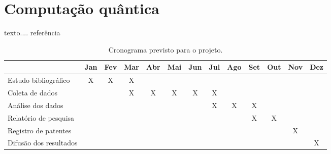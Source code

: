\chapter{Computação quântica}

texto.... referência~\cite{chomsky57}

\begin{table}
  \begin{tabular}{l|cccccc|cccccc}
    \hline
    & Jan & Fev & Mar & Abr & Mai & Jun & Jul & Ago & Set & Out & Nov & Dez \\
    \hline
    Estudo bibliográfico   & X & X & X &   &   &   &   &   &   &   &   &   \\
    Coleta de dados        &   &   & X & X & X & X & X &   &   &   &   &   \\
    Análise dos dados      &   &   &   &   &   &   & X & X & X &   &   &   \\
    Relatório de pesquisa  &   &   &   &   &   &   &   &   & X & X &   &   \\
    Registro de patentes   &   &   &   &   &   &   &   &   &   &   & X &   \\
    Difusão dos resultados &   &   &   &   &   &   &   &   &   &   &   & X \\
    \hline
  \end{tabular}
  \caption{Cronograma previsto para o projeto.}
  \label{tab:cronograma}
\end{table}

